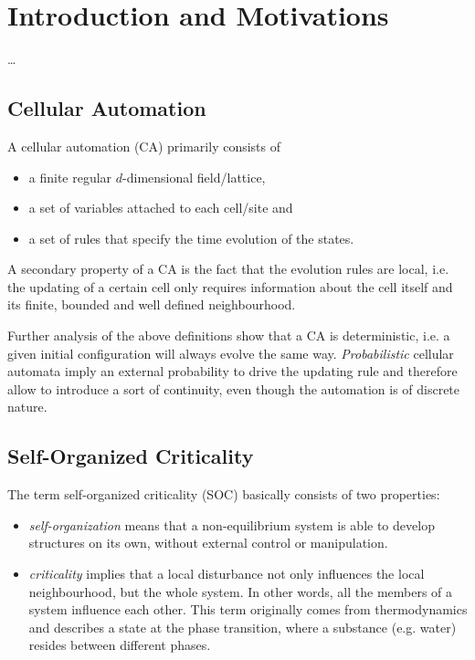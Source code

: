 \chapter{Introduction and Motivations}
\thispagestyle{fancy}


\ldots

\section{Cellular Automation}
A cellular automation (CA) primarily consists of
\begin{itemize}
\item a finite regular $d$-dimensional field/lattice,
\item a set of variables attached to each cell/site and
\item a set of rules that specify the time evolution of the states.
\end{itemize}
A secondary property of a CA is the fact that the evolution rules are local, i.e. the updating of a certain cell only requires information about the cell itself and its finite, bounded and well defined neighbourhood.

Further analysis of the above definitions show that a CA is deterministic, i.e. a given initial configuration will always evolve the same way. \emph{Probabilistic} cellular automata imply an external probability to drive the updating rule and therefore allow to introduce a sort of continuity, even though the automation is of discrete nature.

\section{Self-Organized Criticality}
The term self-organized criticality (SOC) basically consists of two properties:
\begin{itemize}
\item \emph{self-organization} means that a non-equilibrium system is able to develop structures on its own, without external control or manipulation.
\item \emph{criticality} implies that a local disturbance not only influences the local neighbourhood, but the whole system. In other words, all the members of a system influence each other. This term originally comes from thermodynamics and describes a state at the phase transition, where a substance (e.g. water) resides between different phases.
\end{itemize}

